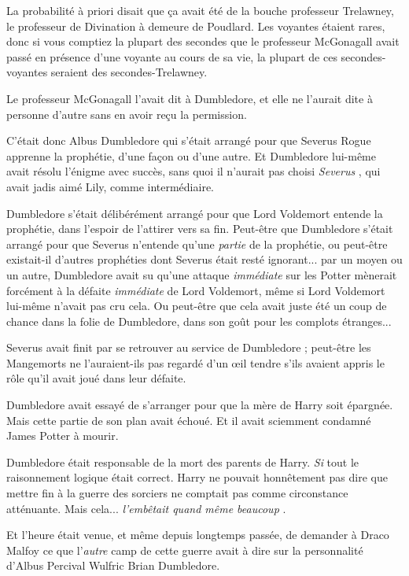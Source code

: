 La probabilité à priori disait que ça avait été de la bouche professeur Trelawney, le professeur de Divination à demeure de Poudlard. Les voyantes étaient rares, donc si vous comptiez la plupart des secondes que le professeur McGonagall avait passé en présence d'une voyante au cours de sa vie, la plupart de ces secondes-voyantes seraient des secondes-Trelawney.

Le professeur McGonagall l'avait dit à Dumbledore, et elle ne l'aurait dite à personne d'autre sans en avoir reçu la permission.

C'était donc Albus Dumbledore qui s'était arrangé pour que Severus Rogue apprenne la prophétie, d'une façon ou d'une autre. Et Dumbledore lui-même avait résolu l'énigme avec succès, sans quoi il n'aurait pas choisi \emph{Severus} , qui avait jadis aimé Lily, comme intermédiaire.

Dumbledore s'était délibérément arrangé pour que Lord Voldemort entende la prophétie, dans l'espoir de l'attirer vers sa fin. Peut-être que Dumbledore s'était arrangé pour que Severus n'entende qu'une \emph{partie}  de la prophétie, ou peut-être existait-il d'autres prophéties dont Severus était resté ignorant... par un moyen ou un autre, Dumbledore avait su qu'une attaque \emph{immédiate}  sur les Potter mènerait forcément à la défaite \emph{immédiate}  de Lord Voldemort, même si Lord Voldemort lui-même n'avait pas cru cela. Ou peut-être que cela avait juste été un coup de chance dans la folie de Dumbledore, dans son goût pour les complots étranges...

Severus avait finit par se retrouver au service de Dumbledore ; peut-être les Mangemorts ne l'auraient-ils pas regardé d'un œil tendre s'ils avaient appris le rôle qu'il avait joué dans leur défaite.

Dumbledore avait essayé de s'arranger pour que la mère de Harry soit épargnée. Mais cette partie de son plan avait échoué. Et il avait sciemment condamné James Potter à mourir.

Dumbledore était responsable de la mort des parents de Harry. \emph{Si}  tout le raisonnement logique était correct. Harry ne pouvait honnêtement pas dire que mettre fin à la guerre des sorciers ne comptait pas comme circonstance atténuante. Mais cela... \emph{l'embêtait quand même beaucoup} .

Et l'heure était venue, et même depuis longtemps passée, de demander à Draco Malfoy ce que l'\emph{autre}  camp de cette guerre avait à dire sur la personnalité d'Albus Percival Wulfric Brian Dumbledore.

